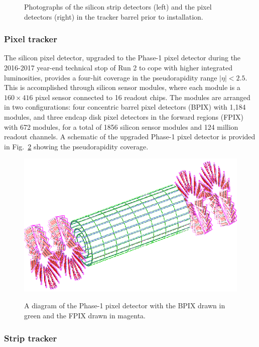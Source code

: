 \begin{figure}[H]
{    } 
    \caption{Photographs of the silicon strip detectors (left) and the pixel detectors (right) in the tracker barrel prior to installation.}
    \label{fig:Tracker}
\end{figure}

\subsubsection{Pixel tracker} \label{sec:PixelTracker}

The silicon pixel detector, upgraded to the Phase-1 pixel detector \cite{PixelUpgrade} during the 2016-2017 year-end technical stop of Run 2 to cope with higher integrated luminosities, provides a four-hit coverage in the pseudorapidity range $|\eta|<2.5$. This is accomplished through silicon sensor modules, where each module is a $160\times 416$ pixel sensor connected to 16 readout chips. The modules are arranged in two configurations: four concentric barrel pixel detectors (BPIX) with 1,184 modules, and three endcap disk pixel detectors in the forward regions (FPIX) with 672 modules, for a total of 1856 silicon sensor modules and 124 million readout channels. A schematic of the upgraded Phase-1 pixel detector is provided in Fig.~\ref{fig:PixelDiagram} showing the pseudorapidity coverage.

\begin{figure}[H]
    \centering
    {\includegraphics[width=\textwidth]{Images/CMS/PixelDiagram2.png}}
    \caption{A diagram of the Phase-1 pixel detector with the BPIX drawn in green and the FPIX drawn in magenta.}
    \label{fig:PixelDiagram}
\end{figure}

\subsubsection{Strip tracker} \label{sec:StripTracker}

